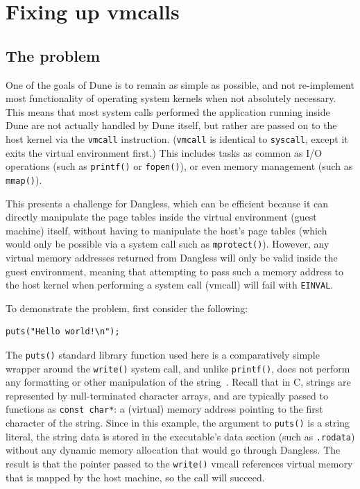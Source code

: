 \section{Fixing up vmcalls}

\subsection{The problem}

One of the goals of Dune is to remain as simple as possible, and not re-implement most functionality of operating system kernels when not absolutely necessary. This means that most system calls performed the application running inside Dune are not actually handled by Dune itself, but rather are passed on to the host kernel via the \lstinline!vmcall! instruction. (\lstinline!vmcall! is identical to \lstinline!syscall!, except it exits the virtual environment first.) This includes tasks as common as I/O operations (such as \lstinline!printf()! or \lstinline!fopen()!), or even memory management (such as \lstinline!mmap()!).

This presents a challenge for Dangless, which can be efficient because it can directly manipulate the page tables inside the virtual environment (guest machine) itself, without having to manipulate the host's page tables (which would only be possible via a system call such as \lstinline!mprotect()!). However, any virtual memory addresses returned from Dangless will only be valid inside the guest environment, meaning that attempting to pass such a memory address to the host kernel when performing a system call (vmcall) will fail with \lstinline!EINVAL!.

To demonstrate the problem, first consider the following:

\begin{lstlisting}
puts("Hello world!\n");
\end{lstlisting}

The \lstinline!puts()! standard library function used here is a comparatively simple wrapper around the \lstinline!write()! system call, and unlike \lstinline!printf()!, does not perform any formatting or other manipulation of the string~\cite{glibc-puts-analysis}. Recall that in C, strings are represented by null-terminated character arrays, and are typically passed to functions as \lstinline!const char*!: a (virtual) memory address pointing to the first character of the string. Since in this example, the argument to \lstinline!puts()! is a string literal, the string data is stored in the executable's data section (such as \texttt{.rodata}) without any dynamic memory allocation that would go through Dangless. The result is that the pointer passed to the \lstinline!write()! vmcall references virtual memory that is mapped by the host machine, so the call will succeed.

